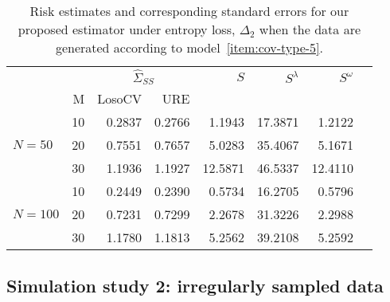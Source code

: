 \documentclass[12pt]{article}
\theoremstyle{definition}
\begin{document}

\begin{table}[H] \label{table:simulation-1-entropy-loss-sigma-5}
\centering
\caption{Risk estimates and corresponding standard errors for our proposed estimator under entropy loss, $\Delta_2$ when the data are generated according to model~\ref{item:cov-type-5}.} 
\begin{tabular}{l|r|rrrrrr}
&  & \multicolumn{2}{c}{$\hat{\Sigma}_{SS}$} & $S$ & $S^\lambda$ & $S^\omega$ \\ 
&M & \mbox{LosoCV} & \mbox{URE} &  \\ 
  \hline
 &    10 & 0.2837 & 	  0.2766	& 1.1943 &  17.3871 & 1.2122 \\ 
$N = 50$&    20 & 0.7551& 0.7657& 5.0283& 35.4067 & 5.1671 \\ 
  &    30 & 1.1936 & 1.1927& 12.5871& 46.5337 & 12.4110  \\ \hdashline
 &    10 & 0.2449 &  0.2390 & 0.5734 & 16.2705 & 0.5796\\ 
  $N = 100$ &    20 & 0.7231 & 0.7299 & 2.2678& 31.3226 & 2.2988 \\ 
   &    30 & 1.1780 & 1.1813 & 5.2562 & 39.2108 & 5.2592 \\
  \end{tabular}
\end{table}



\subsection{Simulation study 2: irregularly sampled data}

\setlength{\dashlinedash}{0.5pt}
\setlength{\dashlinegap}{1pt}
\setlength{\arrayrulewidth}{0.2pt}
\end{document}

